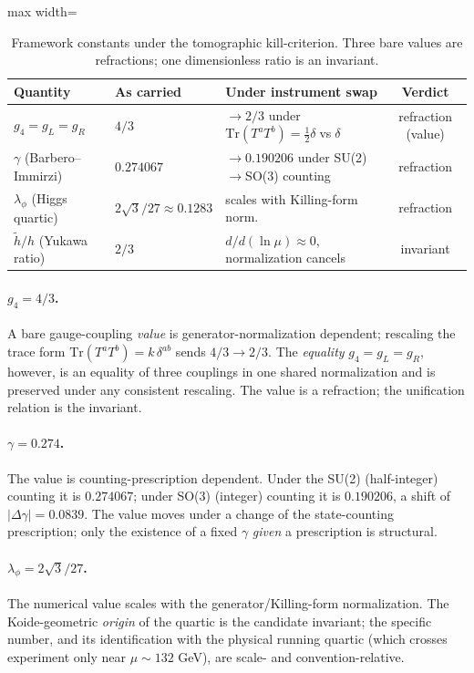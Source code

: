 \documentclass[11pt]{article}
\begin{document}
\begin{table}[h]
\centering
\begin{adjustbox}{max width=\linewidth}\begin{tabular}{lllc}
\toprule
Quantity & As carried & Under instrument swap & Verdict\\
\midrule
$g_4=g_L=g_R$ & $4/3$ & $\to 2/3$ under $\mathrm{Tr}(T^aT^b)=\tfrac12\delta\;$vs$\;\delta$ & refraction (value)\\
$\gamma$ (Barbero--Immirzi) & $0.274067$ & $\to 0.190206$ under SU(2)$\to$SO(3) counting & refraction\\
$\lambda_\phi$ (Higgs quartic) & $2\sqrt3/27\approx0.1283$ & scales with Killing-form norm.\ & refraction\\
$\tilde h/h$ (Yukawa ratio) & $2/3$ & $d/d(\ln\mu)\approx 0$, normalization cancels & invariant\\
\bottomrule
\end{tabular}\end{adjustbox}
\caption{Framework constants under the tomographic kill-criterion. Three bare values are
refractions; one dimensionless ratio is an invariant.}
\label{tab:constants}
\end{table}

\paragraph{$g_4=4/3$.} A bare gauge-coupling \emph{value} is generator-normalization
dependent; rescaling the trace form $\mathrm{Tr}(T^aT^b)=k\,\delta^{ab}$ sends $4/3\to
2/3$. The \emph{equality} $g_4=g_L=g_R$, however, is an equality of three couplings in
one shared normalization and is preserved under any consistent rescaling. The value is a
refraction; the unification relation is the invariant.

\paragraph{$\gamma=0.274$.} The value is counting-prescription dependent. Under the
SU(2) (half-integer) counting it is $0.274067$; under SO(3) (integer) counting it is
$0.190206$, a shift of $|\Delta\gamma|=0.0839$. The value moves under a change of the
state-counting prescription; only the existence of a fixed $\gamma$ \emph{given} a
prescription is structural.

\paragraph{$\lambda_\phi=2\sqrt3/27$.} The numerical value scales with the
generator/Killing-form normalization. The Koide-geometric \emph{origin} of the quartic
is the candidate invariant; the specific number, and its identification with the
physical running quartic (which crosses experiment only near $\mu\sim132$ GeV), are
scale- and convention-relative.
\end{document}
